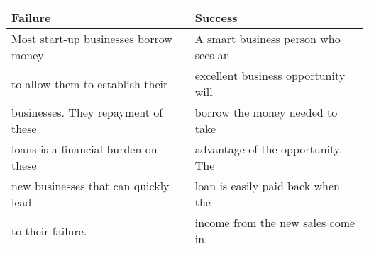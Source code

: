 \documentclass[11pt]{article}
\begin{document}
\begin{center}
\begin{tabular}{ll}
Failure & Success\\
\hline
Most start-up businesses borrow money & A smart business person who sees an\\
to allow them to establish their & excellent business opportunity will\\
businesses. They repayment of these & borrow the money needed to take\\
loans is a financial burden on these & advantage of the opportunity. The\\
new businesses that can quickly lead & loan is easily paid back when the\\
to their failure. & income from the new sales come in.\\
\end{tabular}
\end{center}
\end{document}
